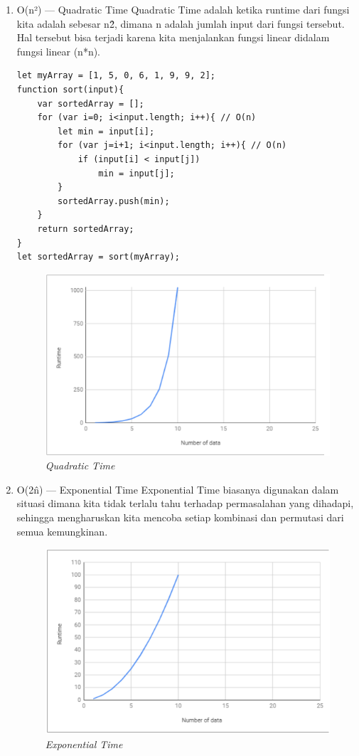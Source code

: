 \begin{enumerate}
\item O(n²) — Quadratic Time
Quadratic Time adalah ketika runtime dari fungsi kita adalah sebesar n\^2, dimana n adalah jumlah input dari fungsi tersebut. Hal tersebut bisa terjadi karena kita menjalankan fungsi linear didalam fungsi linear (n*n).
\begin{lstlisting}
let myArray = [1, 5, 0, 6, 1, 9, 9, 2];
function sort(input){
    var sortedArray = [];
    for (var i=0; i<input.length; i++){ // O(n)
        let min = input[i];
        for (var j=i+1; i<input.length; i++){ // O(n)
            if (input[i] < input[j])
                min = input[j];
        }
        sortedArray.push(min);
    }
    return sortedArray;
}
let sortedArray = sort(myArray);
\end{lstlisting}
\begin{figure}[H]
    \centering
    \includegraphics[scale=0.5]{figures/quadric_time}
    \caption{\textit{Quadratic Time}}
    \label{quadrat}
\end{figure}

\item O(2\^n) — Exponential Time
Exponential Time biasanya digunakan dalam situasi dimana kita tidak terlalu tahu terhadap permasalahan yang dihadapi, sehingga mengharuskan kita mencoba setiap kombinasi dan permutasi dari semua kemungkinan.
\begin{figure}[H]
    \centering
    \includegraphics[scale=0.5]{figures/exponential_time}
    \caption{\textit{Exponential Time}}
    \label{exponential}
\end{figure}
\end{enumerate}
